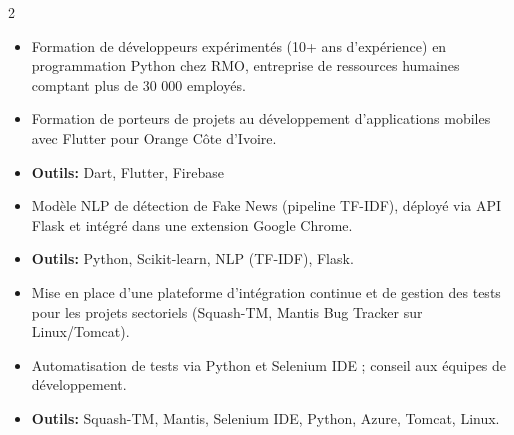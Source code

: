 \documentclass[10pt,a4paper,ragged2e,withhyper]{altacv}
\begin{document}
\begin{paracol}{2}
            \begin{itemize}
                \item Formation de développeurs expérimentés (10+ ans d'expérience) en programmation Python chez RMO, entreprise de ressources humaines comptant plus de 30 000 employés.
            \end{itemize}
            \divider
            
            \begin{itemize}
                \item Formation de porteurs de projets au développement d'applications mobiles avec Flutter pour Orange Côte d'Ivoire.
                \item \textcolor{SecondaryColor}{\textbf{Outils: }} Dart, Flutter, Firebase
            \end{itemize}

        \divider

        \begin{itemize}
            \item Modèle NLP de détection de Fake News (pipeline TF-IDF), déployé via API Flask et intégré dans une extension Google Chrome.
            \item \textcolor{SecondaryColor}{\textbf{Outils: }} Python, Scikit-learn, NLP (TF-IDF), Flask.
        \end{itemize}

        \divider
        
        \begin{itemize}
            \item Mise en place d'une plateforme d'intégration continue et de gestion des tests pour les projets sectoriels (Squash-TM, Mantis Bug Tracker sur Linux/Tomcat).
            \item Automatisation de tests via Python et Selenium IDE ; conseil aux équipes de développement.
            \item \textcolor{SecondaryColor}{\textbf{Outils: }} Squash-TM, Mantis, Selenium IDE, Python, Azure, Tomcat, Linux.
        \end{itemize}


\end{paracol}
\end{document}
